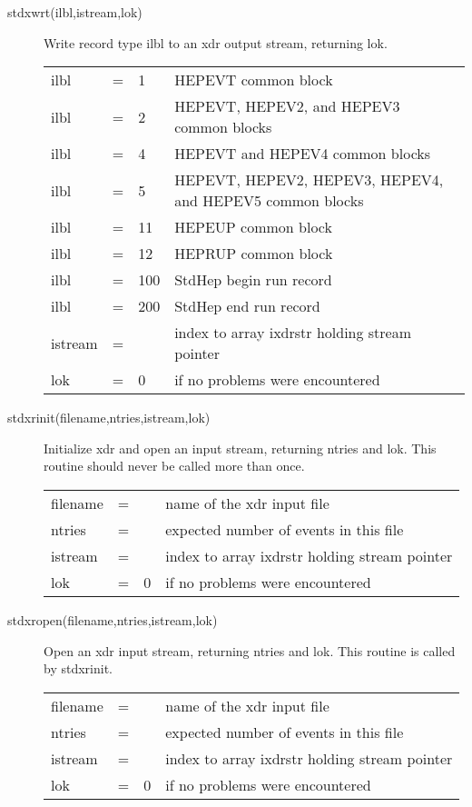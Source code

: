 \begin{description}
\item[stdxwrt(ilbl,istream,lok)]  
 Write record type ilbl to an xdr output stream, returning lok.

\begin{tabular}{lcll}
ilbl & = & 1   & HEPEVT common block \\
ilbl & = & 2   & HEPEVT, HEPEV2, and HEPEV3 common blocks \\
ilbl & = & 4   & HEPEVT and HEPEV4 common blocks \\
ilbl & = & 5   & HEPEVT, HEPEV2, HEPEV3, HEPEV4, and HEPEV5 common blocks \\
ilbl & = & 11  & HEPEUP common block \\
ilbl & = & 12  & HEPRUP common block \\
ilbl & = & 100 & StdHep begin run record \\
ilbl & = & 200 & StdHep end run record \\
istream & = &  & index to array ixdrstr holding stream pointer \\
lok  & = & 0   & if no problems were encountered \\
\end{tabular}

\item[stdxrinit(filename,ntries,istream,lok)]
 Initialize xdr and open an input stream, returning ntries and lok.
 This routine should never be called more than once.

\begin{tabular}{lcll}
filename & = &  & name of the xdr input file \\
ntries & = &  & expected number of events in this file \\
istream & = &  & index to array ixdrstr holding stream pointer \\
lok  & = & 0   & if no problems were encountered \\
\end{tabular}

\item[stdxropen(filename,ntries,istream,lok)] 
 Open an xdr input stream, returning ntries and lok.
 This routine is called by stdxrinit.

\begin{tabular}{lcll}
filename & = &  & name of the xdr input file \\
ntries & = &  & expected number of events in this file \\
istream & = &  & index to array ixdrstr holding stream pointer \\
lok  & = & 0   & if no problems were encountered \\
\end{tabular}


\end{description}
